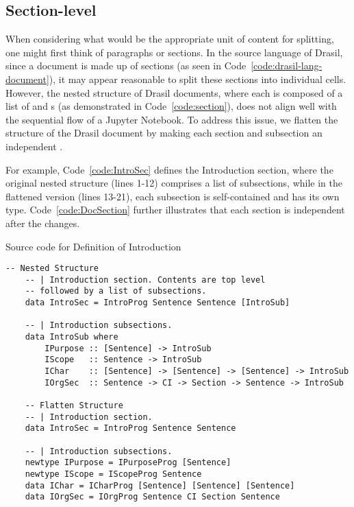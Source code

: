 \subsection{Section-level}
When considering what would be the appropriate unit of content for splitting, 
one might first think of paragraphs or sections. In the source language of 
Drasil, since a document is made up of sections (as seen in 
Code~\ref{code:drasil-lang-document}), it may appear reasonable to split these 
sections into individual cells. However, the nested structure of Drasil 
documents, where each  is composed of a list of 
 and s (as demonstrated in 
Code~\ref{code:section}), does not align well with the sequential flow of a 
Jupyter Notebook. To address this issue, we flatten the structure of the Drasil 
document by making each section and subsection an independent 
. 

For example, Code~\ref{code:IntroSec} defines the Introduction section, where 
the original nested structure (lines 1-12) comprises a list of subsections, 
while in the flattened version (lines 13-21), each subsection is self-contained 
and has its own type. Code~\ref{code:DocSection} further illustrates that each 
section is independent after the changes.

\begin{listing}[h]
	\caption{Source code for Definition of Introduction}
	\label{code:IntroSec}
	\begin{lstlisting}[language=haskell1]
	-- Nested Structure
	-- | Introduction section. Contents are top level 
	-- followed by a list of subsections.
	data IntroSec = IntroProg Sentence Sentence [IntroSub]
		
	-- | Introduction subsections.
	data IntroSub where
		IPurpose :: [Sentence] -> IntroSub
		IScope   :: Sentence -> IntroSub
		IChar    :: [Sentence] -> [Sentence] -> [Sentence] -> IntroSub
		IOrgSec  :: Sentence -> CI -> Section -> Sentence -> IntroSub
	
	-- Flatten Structure
	-- | Introduction section.
	data IntroSec = IntroProg Sentence Sentence
	
	-- | Introduction subsections.
	newtype IPurpose = IPurposeProg [Sentence] 
	newtype IScope = IScopeProg Sentence 
	data IChar = ICharProg [Sentence] [Sentence] [Sentence]
	data IOrgSec = IOrgProg Sentence CI Section Sentence
	\end{lstlisting}
\end{listing}


